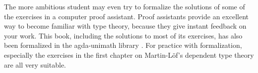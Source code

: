 The more ambitious student may even try to formalize the solutions of some of the exercises in a computer proof assistant. Proof assistants provide an excellent way to become familiar with type theory, because they give instant feedback on your work. This book, including the solutions to most of its exercises, has also been formalized in the agda-unimath library \cite{Agda-UniMath}. For practice with formalization, especially the exercises in the first chapter on Martin-L\"of's dependent type theory are all very suitable.

